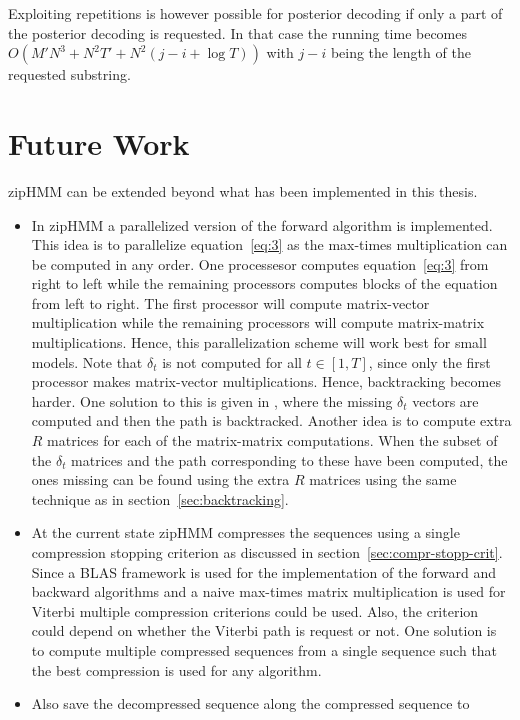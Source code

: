 Exploiting repetitions is however possible for posterior decoding if only a
part of the posterior decoding is requested. In that case the running time
becomes $O(M' N^3 + N^2 T' + N^2 (j - i + \log T))$ with $j - i$ being the
length of the requested substring.

\section{Future Work}

zipHMM can be extended beyond what has been implemented in this thesis.

\begin{itemize}
\item In zipHMM a parallelized version of the forward algorithm is implemented.
  This idea is to parallelize equation~\eqref{eq:3} as the max-times
  multiplication can be computed in any order. One processesor computes
  equation~\eqref{eq:3} from right to left while the remaining processors
  computes blocks of the equation from left to right. The first processor will
  compute matrix-vector multiplication while the remaining processors will
  compute matrix-matrix multiplications. Hence, this parallelization scheme
  will work best for small models. Note that $\delta_t$ is not computed for all
  $t \in [1, T]$, since only the first processor makes matrix-vector
  multiplications. Hence, backtracking becomes harder. One solution to this is
  given in \citet{sand2014engineering}, where the missing $\delta_t$ vectors
  are computed and then the path is backtracked. Another idea is to compute
  extra $R$ matrices for each of the matrix-matrix computations. When the
  subset of the $\delta_t$ matrices and the path corresponding to these have
  been computed, the ones missing can be found using the extra $R$ matrices
  using the same technique as in section~\ref{sec:backtracking}.
\item At the current state zipHMM compresses the sequences using a single
  compression stopping criterion as discussed in
  section~\ref{sec:compr-stopp-crit}. Since a BLAS framework is used for the
  implementation of the forward and backward algorithms and a naive max-times
  matrix multiplication is used for Viterbi multiple compression criterions
  could be used. Also, the criterion could depend on whether the Viterbi path
  is request or not. One solution is to compute multiple compressed sequences
  from a single sequence such that the best compression is used for any algorithm.
\item Also save the decompressed sequence along the compressed sequence to

\end{itemize}
